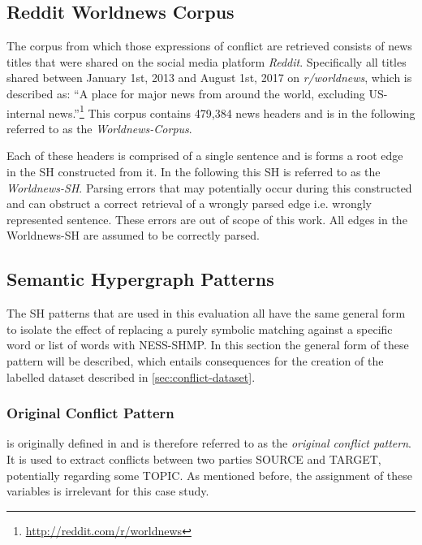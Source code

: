 \documentclass[11pt]{scrreprt}
\let\citef\cite  %
\let\cite\parencite  %
\begin{document}
\subsection{Reddit Worldnews Corpus}
The corpus from which those expressions of conflict are retrieved consists of news titles that were shared on the social media platform \textit{Reddit}. Specifically all titles shared between January 1st, 2013 and August 1st, 2017 on \textit{r/worldnews}, which is described as: “A place for major news from around the world, excluding US-internal news.”\footnote{\url{http://reddit.com/r/worldnews}} This corpus contains 479,384 news headers and is in the following referred to as the \textit{Worldnews-Corpus}.

Each of these headers is comprised of a single sentence and is forms a root edge in the SH constructed from it. In the following this SH is referred to as the \textit{Worldnews-SH}. Parsing errors that may potentially occur during this constructed and can obstruct a correct retrieval of a wrongly parsed edge i.e. wrongly represented sentence. These errors are out of scope of this work. All edges in the Worldnews-SH are assumed to be correctly parsed.

%


\subsection{Semantic Hypergraph Patterns}
\label{sec:sh-patterns}
The SH patterns that are used in this evaluation all have the same general form to isolate the effect of replacing a purely symbolic matching against a specific word or list of words with NESS-SHMP. In this section the general form of these pattern will be described, which entails consequences for the creation of the labelled dataset described in \cref{sec:conflict-dataset}. 



\subsubsection{Original Conflict Pattern}
 is originally defined in \citef[p.~22]{menezesSemanticHypergraphs2021} and is therefore referred to as the \textit{original conflict pattern}. It is used to extract conflicts between two parties \textsf{SOURCE} and \textsf{TARGET}, potentially regarding some \textsf{TOPIC}. As mentioned before, the assignment of these variables is irrelevant for this case study.
\end{document}
